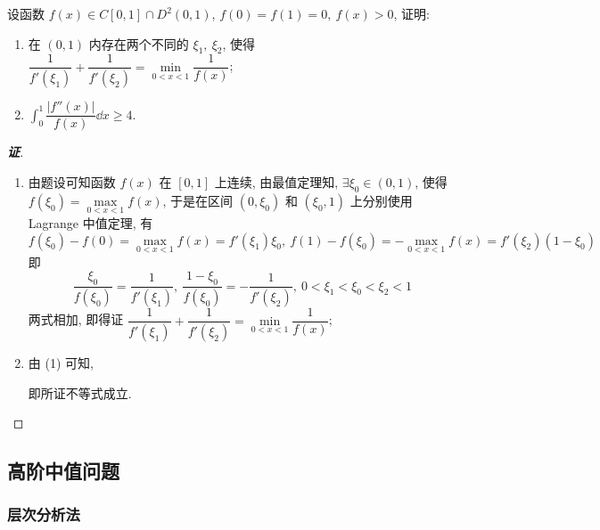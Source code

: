 \begin{example}
    设函数 $f(x)\in C[0,1]\cap D^2(0,1)$, $f(0)=f(1)=0,~f(x)>0$, 证明:
    \begin{enumerate}[label=(\arabic{*})]
        \item 在 $(0,1)$ 内存在两个不同的 $\xi_1,~\xi_2$, 使得 $\dfrac{1}{f'(\xi_1)}+\dfrac{1}{f'(\xi_2)}=\min\limits_{0<x<1}\dfrac{1}{f(x)}$;
        \item $\displaystyle\int_{0}^{1}\dfrac{|f''(x)|}{f(x)}\dd x\geqslant 4.$
    \end{enumerate}
\end{example}
\begin{proof}[{\songti \textbf{证}}]
    \begin{enumerate}[label=(\arabic{*})]
        \item 由题设可知函数 $f(x)$ 在 $[0,1]$ 上连续, 由最值定理知, $\exists\xi_0\in(0,1)$, 使得 $f(\xi_0)=\max\limits_{0<x<1}f(x)$, 于是在区间 $(0,\xi_0)$ 和 $(\xi_0,1)$ 上分别使用 Lagrange 中值定理, 有
              $$f(\xi_0)-f(0)=\max\limits_{0<x<1}f(x)=f'(\xi_1)\xi_0,~f(1)-f(\xi_0)=-\max\limits_{0<x<1}f(x)=f'(\xi_2)(1-\xi_0)$$
              即 $$\dfrac{\xi_0}{f(\xi_0)}=\dfrac{1}{f'(\xi_1)},~\dfrac{1-\xi_0}{f(\xi_0)}=-\dfrac{1}{f'(\xi_2)},~0<\xi_1<\xi_0<\xi_2<1$$
              两式相加, 即得证 $\dfrac{1}{f'(\xi_1)}+\dfrac{1}{f'(\xi_2)}=\min\limits_{0<x<1}\dfrac{1}{f(x)}$;
        \item 由 (1) 可知, 
              即所证不等式成立.
    \end{enumerate}
\end{proof}

\subsection{高阶中值问题}

\subsubsection{层次分析法}

